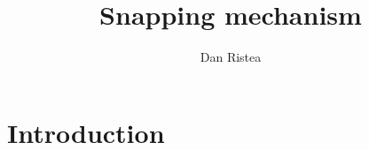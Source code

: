 \documentclass[orivec,envcountsame]{llncs}
\title{Snapping mechanism}
\author{Dan Ristea}
\institute{
  University College London, \email{dan.ristea.19@ucl.ac.uk}
}
\begin{document}
\maketitle

\pagebreak
\section{Introduction}

\newpage


\end{document}
